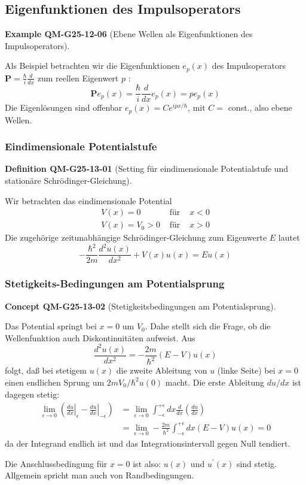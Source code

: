 \documentclass[10pt, letterpaper]{article}
\newcommand{\CustomHeading}[3]{%
  \par\medskip\noindent%
  \textbf{#1 #2} \textnormal{(#3)}.\enskip%
}
\newenvironment{DEF}[2]{\begin{unitbox}\CustomHeading{Definition}{#1}{#2}}{\end{unitbox}}
\newenvironment{EXA}[2]{\begin{unitbox}\CustomHeading{Example}{#1}{#2}}{\end{unitbox}}
\newenvironment{CONC}[2]{\begin{unitbox}\CustomHeading{Concept}{#1}{#2}}{\end{unitbox}}
\begin{document}
\subsection*{Eigenfunktionen des Impulsoperators}


\begin{EXA}{QM-G25-12-06}{Ebene Wellen als Eigenfunktionen des Impulsoperators}
Als Beispiel betrachten wir die Eigenfunktionen $e_{p}(x)$ des Impulsoperators $\mathbf{P}=\frac{\hbar}{i} \frac{d}{d x}$ zum reellen Eigenwert $p$ :
$$
\mathbf{P} e_{p}(x)=\frac{\hbar}{i} \frac{d}{d x} e_{p}(x)=p e_{p}(x)
$$
Die Eigenlösungen sind offenbar $e_{p}(x)=C e^{i p x / \hbar}$, mit $C=$ const., also ebene Wellen.
\end{EXA}



\subsubsection{Eindimensionale Potentialstufe}


\begin{DEF}{QM-G25-13-01}{Setting für eindimensionale Potentialstufe und stationäre Schrödinger-Gleichung}
Wir betrachten das eindimensionale Potential
$$
\begin{array}{rlll}
V(x)=0 & \text { für } & x<0 \\
V(x)=V_{0}>0 & \text { für } & x>0
\end{array}
$$
Die zugehörige zeitunabhängige Schrödinger-Gleichung zum Eigenwerte $E$ lautet
$$
-\frac{\hbar^{2}}{2 m} \frac{d^{2} u(x)}{d x^{2}}+V(x) u(x)=E u(x)
$$
\end{DEF}


\subsubsection*{Stetigkeits-Bedingungen am Potentialsprung}


\begin{CONC}{QM-G25-13-02}{Stetigkeitsbedingungen am Potentialsprung}
Das Potential springt bei $x=0$ um $V_{0}$. Dahe stellt sich die Frage, ob die Wellenfunktion auch Diskontinuitäten aufweist. Aus
$$
\frac{d^{2} u(x)}{d x^{2}}=-\frac{2 m}{\hbar^{2}}(E-V) u(x)
$$
folgt, daß bei stetigem $u(x)$ die zweite Ableitung von $u$ (linke Seite) bei $x=0$ einen endlichen Sprung um $2 m V_{0} / \hbar^{2} u(0)$ macht.
Die erste Ableitung $d u / d x$ ist dagegen stetig:
$$
\begin{aligned}
\lim _{\epsilon \rightarrow 0}\left(\left.\frac{d u}{d x}\right|_{\epsilon}-\left.\frac{d u}{d x}\right|_{-\epsilon}\right) & =\lim _{\epsilon \rightarrow 0} \int_{-\epsilon}^{+\epsilon} d x \frac{d}{d x}\left(\frac{d u}{d x}\right) \\
& =\lim _{\epsilon \rightarrow 0}-\frac{2 m}{\hbar^{2}} \int_{-\epsilon}^{+\epsilon} d x(E-V) u(x)=0
\end{aligned}
$$
da der Integrand endlich ist und das Integrationsintervall gegen Null tendiert.

Die Anschlussbedingung für $x=0$ ist also: $u(x)$ und $u^{\prime}(x)$ sind stetig. Allgemein spricht man auch von Randbedingungen.
\end{CONC}
\end{document}
